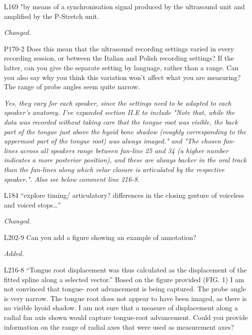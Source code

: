 \documentclass[]{article}
\begin{document}
L169 "by means of a synchronisation signal produced by the ultrasound
unit and amplified by the P-Stretch unit.

\begin{adjustwidth}{1cm}{} \textit{
Changed.
} \end{adjustwidth}

P170-2 Does this mean that the ultrasound recording settings varied in
every recording session, or between the Italian and Polish recording
settings? If the latter, can you give the separate setting by language,
rather than a range. Can you also say why you think this variation won't
affect what you are measuring? The range of probe angles seem quite
narrow.

\begin{adjustwidth}{1cm}{} \textit{
Yes, they vary for each speaker, since the settings need to be adapted to each speaker's anatomy. I've expanded section II.E to include "Note that, while the data was recorded without taking care that the tongue root was visible, the back part of the tongue just above the hyoid bone shadow (roughly corresponding to the uppermost part of the tongue root) was always imaged." and "The chosen fan-lines across all speakers range between fan-line 25 and 34 (a higher number indicates a more posterior position), and these are always backer in the oral track than the fan-lines along which velar closure is articulated by the respective speaker.". Also see below comment line 216-8.
} \end{adjustwidth}

L184 ``explore timing/ articulatory? differences in the closing gesture
of voiceless and voiced stops\ldots{}''

\begin{adjustwidth}{1cm}{} \textit{
Changed.
} \end{adjustwidth}

L202-9 Can you add a figure showing an example of annotation?

\begin{adjustwidth}{1cm}{} \textit{
Added.
} \end{adjustwidth}

L216-8 ``Tongue root displacement was thus calculated as the
displacement of the fitted spline along a selected vector.'' Based on
the figure provided (FIG. 1) I am not convinced that tongue- root
advancement is being captured. The probe angle is very narrow. The
tongue root does not appear to have been imaged, as there is no visible
hyoid shadow. I am not sure that a measure of displacement along a
radial fan axis shown would capture tongue-root advancement. Could you
provide information on the range of radial axes that were used as
measurement axes?
\end{document}
